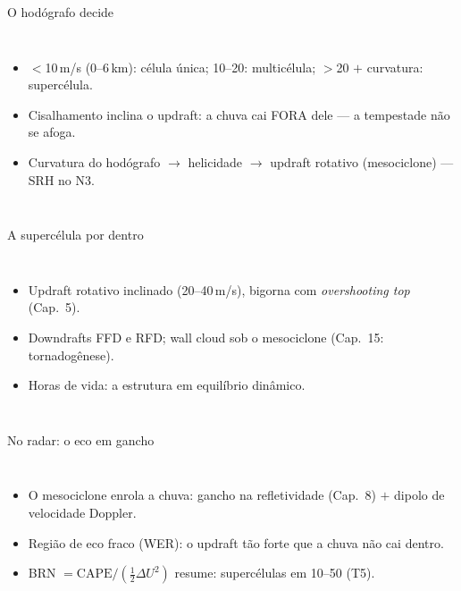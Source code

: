 \documentclass[aspectratio=169,11pt]{beamer}
\begin{document}
\begin{frame}{O hodógrafo decide}
  \begin{columns}
    \begin{itemize}
      \item $<$10\,m/s (0--6\,km): célula única; 10--20: multicélula;
            $>$20 $+$ curvatura: \alert{supercélula}.
      \item Cisalhamento inclina o updraft: a chuva cai FORA dele —
            a tempestade não se afoga.
      \item Curvatura do hodógrafo $\to$ helicidade $\to$ updraft
            \alert{rotativo} (mesociclone) — SRH no N3.
    \end{itemize}
  \end{columns}
\end{frame}

\begin{frame}{A supercélula por dentro}
  \begin{columns}
    \begin{itemize}
      \item Updraft rotativo inclinado (20--40\,m/s), bigorna com
            \emph{overshooting top} (Cap.~5).
      \item Downdrafts FFD e RFD; wall cloud sob o mesociclone
            (Cap.~15: tornadogênese).
      \item Horas de vida: a estrutura em equilíbrio dinâmico.
    \end{itemize}
  \end{columns}
\end{frame}

\begin{frame}{No radar: o eco em gancho}
  \begin{columns}
    \begin{itemize}
      \item O mesociclone enrola a chuva: gancho na refletividade
            (Cap.~8) $+$ dipolo de velocidade Doppler.
      \item Região de eco fraco (WER): o updraft tão forte que a
            chuva não cai dentro.
      \item BRN $= \mathrm{CAPE}/(\tfrac12\Delta U^2)$ resume:
            supercélulas em 10--50 (T5).
    \end{itemize}
  \end{columns}
\end{frame}
\end{document}
